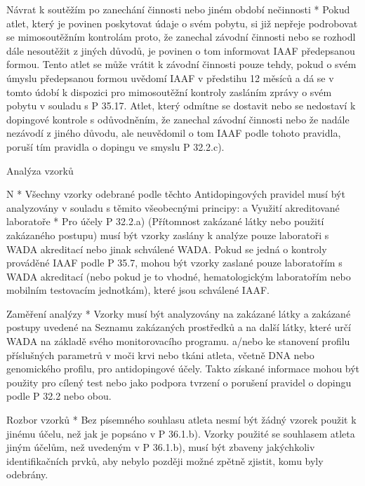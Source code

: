 Návrat k soutěžím po zanechání činnosti nebo jiném období nečinnosti
* Pokud atlet, který je povinen poskytovat údaje o svém pobytu, si již nepřeje podrobovat se mimosoutěžním kontrolám proto, že zanechal závodní činnosti nebo se rozhodl dále nesoutěžit z jiných důvodů, je povinen o tom informovat IAAF předepsanou formou. Tento atlet se může vrátit k závodní činnosti pouze tehdy, pokud o svém úmyslu předepsanou formou uvědomí IAAF v předstihu 12 měsíců a dá se v tomto údobí k dispozici pro mimosoutěžní kontroly zasláním zprávy o svém pobytu v souladu s P 35.17. Atlet, který odmítne se dostavit nebo se nedostaví k dopingové kontrole s odůvodněním, že zanechal závodní činnosti nebo že nadále nezávodí z jiného důvodu, ale neuvědomil o tom IAAF podle tohoto pravidla, poruší tím pravidla o dopingu ve smyslu P 32.2.c).
\enditems

\secc Analýza vzorků

\begitems \style N
* Všechny vzorky odebrané podle těchto Antidopingových pravidel musí být analyzovány v souladu s těmito všeobecnými principy:
  \begitems \style a
  Využití akreditované laboratoře
  * Pro účely P 32.2.a) (Přítomnost zakázané látky nebo použití zakázaného postupu) musí být vzorky zaslány k analýze pouze laboratoři s WADA akreditací nebo jinak schválené WADA. Pokud se jedná o kontroly prováděné IAAF podle P 35.7, mohou být vzorky zaslané pouze laboratořím s WADA akreditací (nebo pokud je to vhodné, hematologickým laboratořím nebo mobilním testovacím jednotkám), které jsou schválené IAAF.

  Zaměření analýzy
  * Vzorky musí být analyzovány na zakázané látky a zakázané postupy uvedené na Seznamu zakázaných prostředků a na další látky, které určí WADA na základě svého monitorovacího programu. a/nebo ke stanovení profilu příslušných parametrů v moči krvi nebo tkáni atleta, včetně DNA nebo genomického profilu, pro antidopingové účely. Takto získané informace mohou být použity pro cílený test nebo jako podpora tvrzení o porušení pravidel o dopingu podle P 32.2 nebo obou.

  Rozbor vzorků
  * Bez písemného souhlasu atleta nesmí být žádný vzorek použit k jinému účelu, než jak je popsáno v P 36.1.b). Vzorky použité se souhlasem atleta jiným účelům, než uvedeným v P 36.1.b), musí být zbaveny jakýchkoliv identifikačních prvků, aby nebylo později možné zpětně zjistit, komu byly odebrány.

